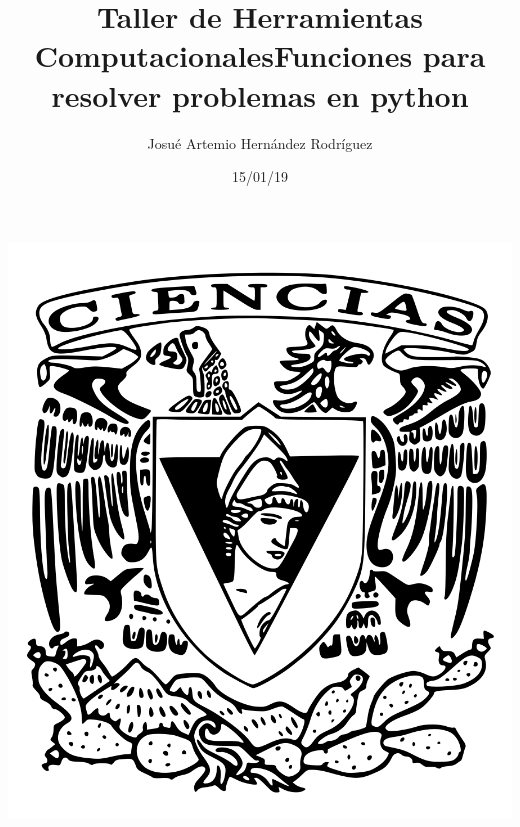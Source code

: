 \documentclass[letterpaper, 12pt, oneside]{article}%
\title{\Huge Taller de Herramientas Computacionales}
\author{Josué Artemio Hernández Rodríguez}%
\date{15/01/19}%
\begin{document}
	\maketitle
	\begin{center}%
		\includegraphics[scale=0.2]{2.png}%
	\end{center}%
	\newpage%
	
	\title{\Huge Funciones para resolver problemas en python\\}%
	
\end{document}
